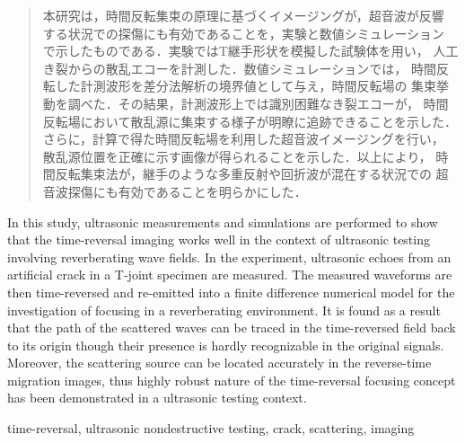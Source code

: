 \documentclass[jscefinal]{jjsce}%
\begin{document}

\begin{abstract}
本研究は，時間反転集束の原理に基づくイメージングが，超音波が反響
する状況での探傷にも有効であることを，実験と数値シミュレーション
で示したものである．実験ではT継手形状を模擬した試験体を用い，
人工き裂からの散乱エコーを計測した．数値シミュレーションでは，
時間反転した計測波形を差分法解析の境界値として与え，時間反転場の
集束挙動を調べた．その結果，計測波形上では識別困難なき裂エコーが，
時間反転場において散乱源に集束する様子が明瞭に追跡できることを示した．
さらに，計算で得た時間反転場を利用した超音波イメージングを行い，
散乱源位置を正確に示す画像が得られることを示した．以上により，
時間反転集束法が，継手のような多重反射や回折波が混在する状況での
超音波探傷にも有効であることを明らかにした．
\end{abstract}
\begin{Eabstract}
In this study, ultrasonic measurements and simulations are performed to show 
that the time-reversal imaging works well in the context of ultrasonic testing 
involving reverberating wave fields. In the experiment, ultrasonic echoes from 
an artificial crack in a T-joint specimen are measured. The measured waveforms 
are then time-reversed and re-emitted into a finite difference numerical 
model for the investigation of focusing in a reverberating environment.
It is found as a result that the path of the scattered waves can be traced 
in the time-reversed field back to its origin though their presence is hardly 
recognizable in the original signals. Moreover, the scattering source 
can be located accurately in the reverse-time migration images, 
thus highly robust nature of the time-reversal focusing concept has 
been demonstrated in a ultrasonic testing context.
\end{Eabstract}
\begin{keyword}
time-reversal, ultrasonic nondestructive testing, crack, scattering, imaging
\end{keyword}
\maketitle
\end{document}
